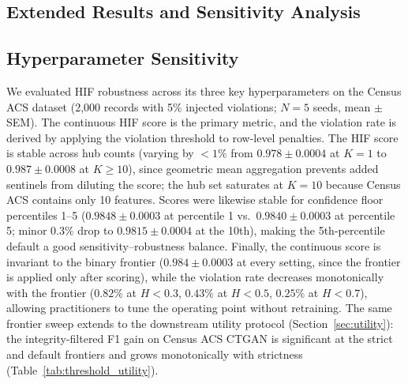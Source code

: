 \documentclass[pdflatex,sn-mathphys-num]{sn-jnl}
\theoremstyle{thmstyleone}%
\theoremstyle{thmstyletwo}%
\theoremstyle{thmstylethree}%
\begin{document}
\begin{appendices}
\section{Extended Results and Sensitivity Analysis}

\subsection{Hyperparameter Sensitivity}\label{app:hyperparameters}

We evaluated HIF robustness across its three key hyperparameters on the Census ACS dataset (2,000 records with 5\% injected violations; $N=5$ seeds, mean $\pm$ SEM). The continuous HIF score is the primary metric, and the violation rate is derived by applying the violation threshold to row-level penalties. The HIF score is stable across hub counts (varying by $<1\%$ from $0.978 \pm 0.0004$ at $K=1$ to $0.987 \pm 0.0008$ at $K\geq 10$), since geometric mean aggregation prevents added sentinels from diluting the score; the hub set saturates at $K=10$ because Census ACS contains only 10 features. Scores were likewise stable for confidence floor percentiles 1--5 ($0.9848 \pm 0.0003$ at percentile 1 vs.\ $0.9840 \pm 0.0003$ at percentile 5; minor $0.3\%$ drop to $0.9815 \pm 0.0004$ at the 10th), making the 5th-percentile default a good sensitivity--robustness balance. Finally, the continuous score is invariant to the binary frontier ($0.984 \pm 0.0003$ at every setting, since the frontier is applied only after scoring), while the violation rate decreases monotonically with the frontier ($0.82\%$ at $H < 0.3$, $0.43\%$ at $H < 0.5$, $0.25\%$ at $H < 0.7$), allowing practitioners to tune the operating point without retraining. The same frontier sweep extends to the downstream utility protocol (Section~\ref{sec:utility}): the integrity-filtered F1 gain on Census ACS CTGAN is significant at the strict and default frontiers and grows monotonically with strictness (Table~\ref{tab:threshold_utility}).


\end{appendices}
\end{document}
